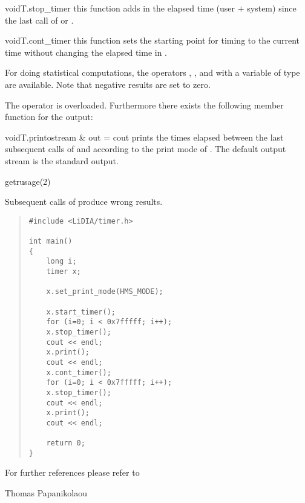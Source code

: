 \HIGH

\begin{fcode}{void}{T.stop_timer}{}
  this function adds in  the elapsed time (user $+$ system)
  since the last call of  or
  .
\end{fcode}

\begin{fcode}{void}{T.cont_timer}{}
  this function sets the starting point for timing to the current time
  without changing the elapsed time in .
\end{fcode}

For doing statistical computations, the operators \code{+}, \code{-},
and \code{/} with a variable of type  are available. Note
that negative results are set to zero.



\IO

The  operator \code{<<} is overloaded.  Furthermore
there exists the following member function for the output:

\begin{cfcode}{void}{T.print}{ostream & out = cout}
  prints the times elapsed between the last subsequent calls of
   and  according to the
  print mode of .  The default output stream is the standard
  output.
\end{cfcode}



\SEEALSO

getrusage(2)



\WARNINGS

Subsequent calls of  produce wrong results.



\EXAMPLES

\begin{quote}
\begin{verbatim}
#include <LiDIA/timer.h>

int main()
{
    long i;
    timer x;

    x.set_print_mode(HMS_MODE);

    x.start_timer();
    for (i=0; i < 0x7fffff; i++);
    x.stop_timer();
    cout << endl;
    x.print();
    cout << endl;
    x.cont_timer();
    for (i=0; i < 0x7fffff; i++);
    x.stop_timer();
    cout << endl;
    x.print();
    cout << endl;

    return 0;
}
\end{verbatim}
\end{quote}

For further references please refer to



\AUTHOR

Thomas Papanikolaou
